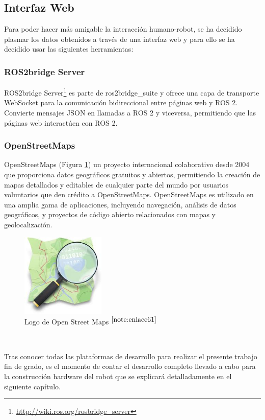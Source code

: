\setcounter{footnote}{59} %


\subsection{Interfaz Web}

Para poder hacer más amigable la interacción humano-robot, se ha decidido plasmar los datos obtenidos a través de una interfaz web y para ello se ha decidido usar las siguientes herramientas: 
 
\subsubsection{ROS2bridge Server}

ROS2bridge Server\footnote{\url{http://wiki.ros.org/rosbridge_server}} es parte de ros2bridge\_suite y ofrece una capa de transporte WebSocket para la comunicación bidireccional entre páginas web y \acs{ROS} 2. Convierte mensajes JSON en llamadas a \acs{ROS} 2 y viceversa, permitiendo que las páginas web interactúen con \acs{ROS} 2. 

\subsubsection{OpenStreetMaps}

OpenStreetMaps (Figura \ref{fig:osm}) un proyecto internacional colaborativo desde 2004 que proporciona datos geográficos gratuitos y abiertos, permitiendo la creación de mapas detallados y editables de cualquier parte del mundo por usuarios voluntarios que den crédito a OpenStreetMaps. OpenStreetMaps es utilizado en una amplia gama de aplicaciones, incluyendo navegación, análisis de datos geográficos, y proyectos de código abierto relacionados con mapas y geolocalización.


\begin{figure} [h!]
	\begin{center}
		\includegraphics[width=4cm]{figs/osm.png}
	\end{center}
	\caption{Logo de Open Street Maps $^{\ref{note:enlace61}}$} 
	\label{fig:osm}
\end{figure}\

\setcounter{footnote}{61} %

Tras conocer todas las plataformas de desarrollo para realizar el presente trabajo fin de grado, es el momento de contar el desarrollo completo llevado a cabo para la construcción hardware del robot que se explicará detalladamente en el siguiente capítulo.
